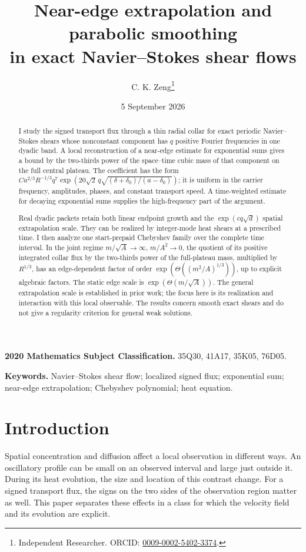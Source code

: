 \documentclass[11pt]{article}
\title{Near-edge extrapolation and parabolic smoothing\\
in exact Navier--Stokes shear flows}
\author{C. K. Zeng\thanks{Independent Researcher.
ORCID: \href{https://orcid.org/0009-0002-5402-3374}{0009-0002-5402-3374}.}}
\date{5 September 2026}
\theoremstyle{definition}
\begin{document}
\maketitle

\begin{abstract}
I study the signed transport flux through a thin radial collar for exact
periodic Navier--Stokes shears whose nonconstant component has \(q\)
positive Fourier frequencies in one dyadic band. A local reconstruction
of a near-edge estimate for exponential sums gives a bound by the
two-thirds power of the space--time cubic mass of that component on the
full central plateau. The coefficient has the form
\(C a^{2/3}R^{-1/3}q^7
\exp(20\sqrt2\,q\sqrt{(\delta+\delta_0)/(a-\delta_0)})\);
it is uniform in the carrier frequency, amplitudes, phases, and constant
transport speed. A time-weighted estimate for decaying exponential sums
supplies the high-frequency part of the argument.

Real dyadic packets retain both linear endpoint growth and the
\(\exp(cq\sqrt d)\) spatial extrapolation scale. They can be realized by
integer-mode heat shears at a prescribed time. I then analyze one
start-prepaid Chebyshev family over the complete time interval. In the
joint regime \(m/\sqrt A\to\infty\), \(m/A^2\to0\), the quotient of its
positive integrated collar flux by the two-thirds power of the full-plateau
mass, multiplied by \(R^{1/3}\), has an edge-dependent factor of order
\(\exp(\Theta((m^2/A)^{1/3}))\), up to explicit algebraic factors.
The static edge scale is \(\exp(\Theta(m/\sqrt A))\).
The general extrapolation scale is established in prior work; the focus
here is its realization and interaction with this local observable.
The results concern smooth exact shears and do not give a regularity
criterion for general weak solutions.
\end{abstract}

\medskip
\noindent\textbf{2020 Mathematics Subject Classification.}
35Q30, 41A17, 35K05, 76D05.

\noindent\textbf{Keywords.}
Navier--Stokes shear flow; localized signed flux; exponential sum;
near-edge extrapolation; Chebyshev polynomial; heat equation.

\section{Introduction}
\label{sec:introduction}

Spatial concentration and diffusion affect a local observation in
different ways. An oscillatory profile can be small on an observed
interval and large just outside it. During its heat evolution, the
size and location of this contrast change. For a signed transport flux,
the signs on the two sides of the observation region matter as well.
This paper separates these effects in a class for which the velocity
field and its evolution are explicit.
\end{document}
